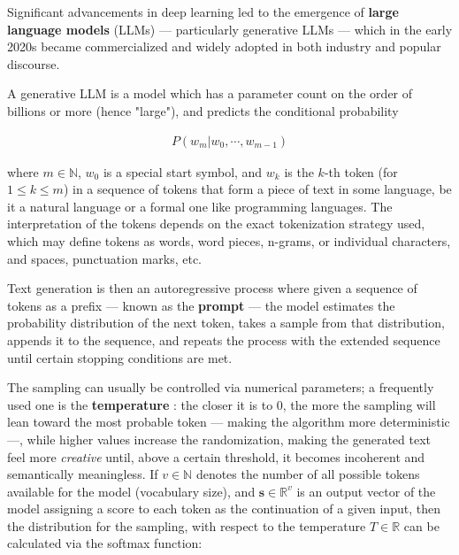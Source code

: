 \documentclass[noindent,nohyp,parspace,titlepage,twoside,12pt]{article}
\begin{document}
      Significant advancements in deep learning \cite{attention,gpt3,gpt4} led
      to the emergence of \textbf{large language models} (LLMs) --- particularly
      generative LLMs --- which in the early 2020s became commercialized and
      widely adopted in both industry and popular discourse.

      A generative LLM is a model which has a parameter count on the order of
      billions or more (hence "large"), and predicts the conditional
      probability \cite{llms}

      \begin{align} \label{eqautoreg}
        P(w_m | w_0, \cdots, w_{m-1})
      \end{align}

      where $m \in \mathbb{N}$, $w_0$ is a special start symbol, and $w_k$ is
      the $k$-th token (for $1 \le k \le m$) in a sequence of tokens that form
      a piece of text in some language, be it a natural language or a formal
      one like programming languages. The interpretation of the tokens depends
      on the exact tokenization strategy used, which may define tokens as
      words, word pieces, n-grams, or individual characters, and spaces,
      punctuation marks, etc.

      Text generation is then an autoregressive process where given a
      sequence of tokens as a prefix --- known as the \textbf{prompt} --- the
      model estimates the probability distribution of the next token, takes a
      sample from that distribution, appends it to the sequence, and repeats
      the process with the extended sequence until certain stopping conditions
      are met.

      The sampling can usually be controlled via numerical parameters; a
      frequently used one is the \textbf{temperature} \cite{temperature}: the
      closer it is to 0, the more the sampling will lean toward the most
      probable token --- making the algorithm more deterministic ---, while
      higher values increase the randomization, making the generated text feel
      more \emph{creative} until, above a certain threshold, it becomes
      incoherent and semantically meaningless. If $v \in \mathbb{N}$ denotes
      the number of all possible tokens available for the model (vocabulary
      size), and $\mathbf{s} \in \mathbb{R}^v$ is an output vector of the model
      assigning a score to each token as the continuation of a given input,
      then the distribution for the sampling, with respect to the temperature
      $T \in \mathbb{R}$ can be calculated via the softmax function:
\end{document}
